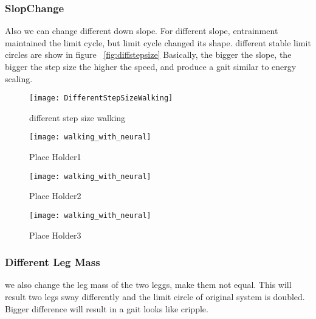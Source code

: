\subsubsection*{SlopChange}
Also we can change different down slope.
For different slope, entrainment maintained the limit cycle, but limit cycle changed its shape.
different stable limit circles are show in figure ~\ref{fig:diffstepsize}
Basically, the bigger the slope, the bigger the step size the higher the speed, and produce a gait similar to energy scaling.

\begin{figure}[!htbp]
  \begin{center}
      \texttt{[image: DifferentStepSizeWalking]}
    \caption{different step size walking}
    \label{fig:differentlr}
\end{center}
\end{figure}


\begin{figure}[!htbp]
  \begin{center}
      \texttt{[image: walking\_with\_neural]}
    \caption{Place Holder1}
    \label{fig:ss1}
\end{center}
\end{figure}

\begin{figure}[!htbp]
  \begin{center}
      \texttt{[image: walking\_with\_neural]}
    \caption{Place Holder2}
    \label{fig:ss2}
\end{center}
\end{figure}

\begin{figure}[!htbp]
  \begin{center}
      \texttt{[image: walking\_with\_neural]}
    \caption{Place Holder3}
    \label{fig:ss3}
\end{center}
\end{figure}




\subsubsection*{Different Leg Mass}
we also change the leg mass of the two leggs, make them not equal.
This will result two legs sway differently and the limit circle of original system is doubled.
Bigger difference will result in a gait looks like cripple.

